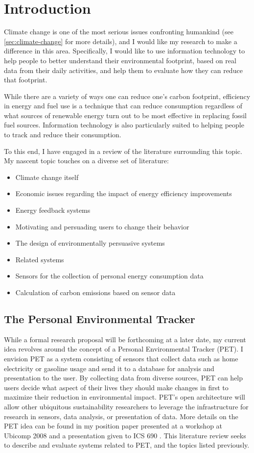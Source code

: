 \chapter{Introduction}
Climate change is one of the most serious issues confronting humankind (see \autoref{sec:climate-change} for more details), and I would like my research to make a difference in this area. Specifically, I would like to use information technology to help people to better understand their environmental footprint, based on real data from their daily activities, and help them to evaluate how they can reduce that footprint.

While there are a variety of ways one can reduce one's carbon footprint, efficiency in energy and fuel use is a technique that can reduce consumption regardless of what sources of renewable energy turn out to be most effective in replacing fossil fuel sources. Information technology is also particularly suited to helping people to track and reduce their consumption.

To this end, I have engaged in a review of the literature surrounding this topic. My nascent topic touches on a diverse set of literature:
\begin{itemize}
	\item Climate change itself
	\item Economic issues regarding the impact of energy efficiency improvements
	\item Energy feedback systems
	\item Motivating and persuading users to change their behavior
	\item The design of environmentally persuasive systems
	\item Related systems
	\item Sensors for the collection of personal energy consumption data
	\item Calculation of carbon emissions based on sensor data
\end{itemize}

\section{The Personal Environmental Tracker}
\label{sec:PET-description}
While a formal research proposal will be forthcoming at a later date, my current idea revolves around the concept of a Personal Environmental Tracker (PET). I envision PET as a system consisting of sensors that collect data such as home electricity or gasoline usage and send it to a database for analysis and presentation to the user. By collecting data from diverse sources, PET can help users decide what aspect of their lives they should make changes in first to maximize their reduction in environmental impact. PET's open architecture will allow other ubiquitous sustainability researchers to leverage the infrastructure for research in sensors, data analysis, or presentation of data. More details on the PET idea can be found in my position paper presented at a workshop at Ubicomp 2008 \cite{csdl2-08-01} and a presentation given to ICS 690 \cite{Brewer2008-PET-presentation}. This literature review seeks to describe and evaluate systems related to PET, and the topics listed previously.